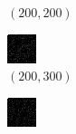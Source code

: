 \documentclass[a4paper, landscape]{article}
\begin{document}
\begin{figure}[H]
\begin{subfigure}{0.09\linewidth}
        \caption*{$(200, 200)$}
    \end{subfigure}
    \begin{subfigure}{0.09\linewidth}
        \centering
        \includegraphics[width=\linewidth]{omp/k = 200, m = 300.png}
        \caption*{$(200, 300)$}
    \end{subfigure}
    \begin{subfigure}{0.09\linewidth}
        \centering
        \includegraphics[width=\linewidth]{omp/k = 200, m = 400.png}

\end{subfigure}
\end{figure}
\end{document}
